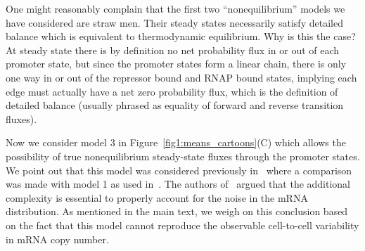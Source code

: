 One might reasonably complain that the first two ``nonequilibrium'' models we
have considered are straw men. Their steady states necessarily satisfy detailed
balance which is equivalent to thermodynamic equilibrium. Why is this the case?
At steady state there is by definition no net probability flux in or out of each
promoter state, but since the promoter states form a linear chain, there is only
one way in or out of the repressor bound and RNAP bound states, implying each
edge must actually have a net zero probability flux, which is the definition of
detailed balance (usually phrased as equality of forward and reverse transition
fluxes).

Now we consider model 3 in Figure~\ref{fig1:means_cartoons}(C) which allows the
possibility of true nonequilibrium steady-state fluxes through the promoter
states. We point out that this model was considered previously
in~\cite{Mitarai2015} where a comparison was made with model 1 as used
in~\cite{Jones2014}. The authors of~\cite{Mitarai2015} argued that the
additional complexity is essential to properly account for the noise in the mRNA
distribution. As mentioned in the main text, we weigh on this conclusion based
on the fact that this model cannot reproduce the observable cell-to-cell 
variability in mRNA copy number.

